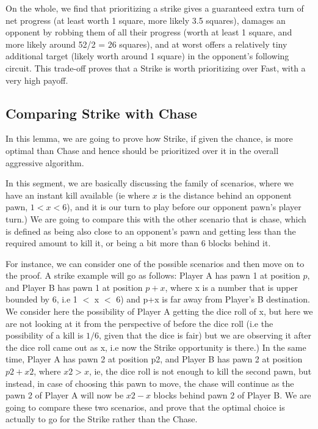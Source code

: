 \documentclass{article} %
\begin{document}
On the whole, we find that prioritizing a strike gives a guaranteed extra turn of net progress (at least worth 1 square, more likely 3.5 squares), damages an opponent by robbing them of all their progress (worth at least 1 square, and more likely around 52/2 = 26 squares), and at worst offers a relatively tiny additional target (likely worth around 1 square) in the opponent’s following circuit. This trade-off proves that a Strike is worth prioritizing over Fast, with a very high payoff.

\subsection{Comparing Strike with Chase}
In this lemma, we are going to prove how Strike, if given the chance, is more optimal than Chase and hence should be prioritized over it in the overall aggressive algorithm.

In this segment, we are basically discussing the family of scenarios, where we have an instant kill available (ie where $x$ is the distance behind an opponent pawn, $1 < x < 6$), and it is our turn to play before our opponent pawn's player turn.) We are going to compare this with the other scenario that is chase, which is defined as being also close to an opponent’s pawn and getting less than the required amount to kill it, or being a bit more than 6 blocks behind it. 

For instance, we can consider one of the possible scenarios and then move on to the proof. A strike example will go as follows: Player A has pawn 1 at position $p$, and Player B has pawn 1 at position $p + x$, where x is a number that is upper bounded by 6, i.e 1 $<$ x $<$ 6) and p+x is far away from Player’s B destination. We consider here the possibility of Player A getting the dice roll of x, but here we are not looking at it from the perspective of before the dice roll (i.e the possibility of a kill is $1/6$, given that the dice is fair) but we are observing it after the dice roll came out as x, i.e now the Strike opportunity is there.)  In the same time, Player A has pawn 2 at position p2, and Player B has pawn 2 at position $p2+x2$, where $x2 > x$, ie, the dice roll is not enough to kill the second pawn, but instead, in case of choosing this pawn to move, the chase will continue as the pawn 2 of Player A will now be $x2-x$ blocks behind pawn 2 of Player B. We are going to compare these two scenarios, and prove that the optimal choice is actually to go for the Strike rather than the Chase. 
\end{document}
